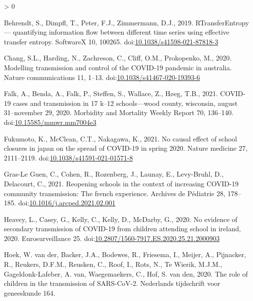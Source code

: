 \documentclass[]{elsarticle} %
\newlength{\cslhangindent}
\newenvironment{CSLReferences}[2] %
 {%
  \setlength{\parindent}{0pt}
  \ifodd #1 \everypar{\setlength{\hangindent}{\cslhangindent}}\ignorespaces\fi
  \ifnum #2 > 0
  \setlength{\parskip}{#2\baselineskip}
  \fi
 }%
 {}
\begin{document}
\hypertarget{refs}{}
\begin{CSLReferences}{1}{0}
\leavevmode\hypertarget{ref-behrendt2019rtransferentropy}{}%
Behrendt, S., Dimpfl, T., Peter, F.J., Zimmermann, D.J., 2019.
RTransferEntropy --- quantifying information flow between different time
series using effective transfer entropy. SoftwareX 10, 100265.
doi:\href{https://doi.org/10.1038/s41598-021-87818-3}{10.1038/s41598-021-87818-3}

\leavevmode\hypertarget{ref-chang2020modelling}{}%
Chang, S.L., Harding, N., Zachreson, C., Cliff, O.M., Prokopenko, M.,
2020. Modelling transmission and control of the COVID-19 pandemic in
australia. Nature communications 11, 1--13.
doi:\href{https://doi.org/10.1038/s41467-020-19393-6}{10.1038/s41467-020-19393-6}

\leavevmode\hypertarget{ref-falk2021covid}{}%
Falk, A., Benda, A., Falk, P., Steffen, S., Wallace, Z., Høeg, T.B.,
2021. COVID-19 cases and transmission in 17 k--12 schools---wood county,
wisconsin, august 31--november 29, 2020. Morbidity and Mortality Weekly
Report 70, 136--140.
doi:\href{https://doi.org/10.15585/mmwr.mm7004e3}{10.15585/mmwr.mm7004e3}

\leavevmode\hypertarget{ref-fukumoto2021no}{}%
Fukumoto, K., McClean, C.T., Nakagawa, K., 2021. No causal effect of
school closures in japan on the spread of COVID-19 in spring 2020.
Nature medicine 27, 2111--2119.
doi:\href{https://doi.org/10.1038/s41591-021-01571-8}{10.1038/s41591-021-01571-8}

\leavevmode\hypertarget{ref-grasleguen2021reopening}{}%
Gras-Le Guen, C., Cohen, R., Rozenberg, J., Launay, E., Levy-Bruhl, D.,
Delacourt, C., 2021. Reopening schools in the context of increasing
COVID-19 community transmission: The french experience. Archives de
Pédiatrie 28, 178--185.
doi:\href{https://doi.org/10.1016/j.arcped.2021.02.001}{10.1016/j.arcped.2021.02.001}

\leavevmode\hypertarget{ref-heavey2020evidence}{}%
Heavey, L., Casey, G., Kelly, C., Kelly, D., McDarby, G., 2020. No
evidence of secondary transmission of COVID-19 from children attending
school in ireland, 2020. Eurosurveillance 25.
doi:\href{https://doi.org/10.2807/1560-7917.ES.2020.25.21.2000903}{10.2807/1560-7917.ES.2020.25.21.2000903}

\leavevmode\hypertarget{ref-vanderhoek2020role}{}%
Hoek, W. van der, Backer, J.A., Bodewes, R., Friesema, I., Meijer, A.,
Pijnacker, R., Reukers, D.F.M., Reusken, C., Roof, I., Rots, N., Te
Wierik, M.J.M., Gageldonk-Lafeber, A. van, Waegemaekers, C., Hof, S. van
den, 2020. The role of children in the transmission of SARS-CoV-2.
Nederlands tijdschrift voor geneeskunde 164.


\end{CSLReferences}
\end{document}
